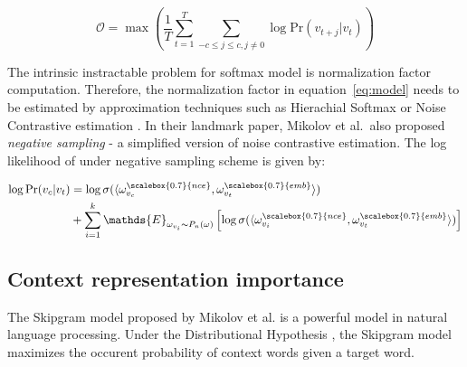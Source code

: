\documentclass[letterpaper]{article}
\begin{document}
            \begin{equation}
                \label{eq:avgloglikelihood}
                \mathcal{O} = \max \left( \frac{1}{T} \sum_{t=1}^{T} \sum_{-c \leq j \leq c, j \neq 0} \log \mbox{Pr} (v_{t+j} | v_t) \right)
            \end{equation}

            The intrinsic instractable problem for softmax model is normalization factor computation. 
            Therefore, the normalization factor in equation~\ref{eq:model} needs to be estimated by 
            approximation techniques such as Hierachial Softmax \cite{hs} or Noise Contrastive estimation
            \cite{nce}. In their landmark paper, Mikolov et al.\  also proposed \emph{negative sampling} - a 
            simplified version of noise contrastive estimation. The log likelihood of under negative
            sampling scheme is given by:

            \begin{equation}
                \label{eq:objneg}
                \begin{aligned}
                \log \mbox{Pr} (v_c | v_t) & = \log \sigma( \langle \omega^{\scalebox{0.7}{nce}}_{v_c} , \omega^{\scalebox{0.7}{emb}}_{v_t} \rangle ) \\
                & + \sum_{i=1}^{k} \mathds{E}_{\omega_{v_i} \sim P_n(\omega)} \left[ \log \sigma( \langle \omega^{\scalebox{0.7}{nce}}_{v_i} , \omega^{\scalebox{0.7}{emb}}_{v_t} \rangle) \right]
                \end{aligned}
            \end{equation}
            

        \subsection{Context representation importance}
            The Skipgram model proposed by Mikolov et al. \cite{skipgram} is a powerful model 
            in natural language processing. Under the Distributional Hypothesis \cite{disthyp},
            the Skipgram model maximizes the occurent probability of context words given a target
            word.  
\end{document}
